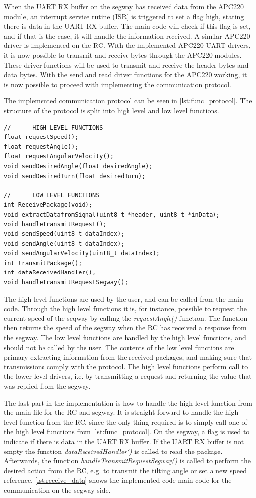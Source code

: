 When the UART RX buffer on the segway has received data from the APC220 module, an interrupt service rutine (ISR) is triggered to set a flag high, stating there is data in the UART RX buffer. The main code will check if this flag is set, and if that is the case, it will handle the information received. 
A similar APC220 driver is implemented on the RC. With the implemented APC220 UART drivers, it is now possible to transmit and receive bytes through the APC220 modules. These driver functions will be used to transmit and receive the header bytes and data bytes. With the send and read driver functions for the APC220 working, it is now possible to proceed with implementing the communication protocol. 

The implemented communication protocol can be seen in \autoref{lst:func_protocol}. The structure of the protocol is split into high level and low level functions.\newpage
{}
\begin{lstlisting}
//		HIGH LEVEL FUNCTIONS
float requestSpeed();
float requestAngle();
float requestAngularVelocity();
void sendDesiredAngle(float desiredAngle);
void sendDesiredTurn(float desiredTurn);

//		LOW LEVEL FUNCTIONS
int ReceivePackage(void);
void extractDatafromSignal(uint8_t *header, uint8_t *inData);
void handleTransmitRequest();
void sendSpeed(uint8_t dataIndex);
void sendAngle(uint8_t dataIndex);
void sendAngularVelocity(uint8_t dataIndex);
int transmitPackage(); 
int dataReceivedHandler();
void handleTransmitRequestSegway();
\end{lstlisting}
The high level functions are used by the user, and can be called from the main code. Through the high level functions it is, for instance, possible to request the current speed of the seqway by calling the \textit{requestAngle()} function. The function then returns the speed of the segway when the RC has received a response from the segway. The low level functions are handled by the high level functions, and should not be called by the user. The contents of the low level functions are primary extracting information from the received packages, and making sure that transmissions comply with the protocol. The high level functions perform call to the lower level drivers, i.e. by transmitting a request and returning the value that was replied from the segway.

The last part in the implementation is how to handle the high level function from the main file for the RC and segway. It is straight forward to handle the high level function from the RC, since the only thing required is to simply call one of the high level functions from \autoref{lst:func_protocol}. On the segway, a flag is used to indicate if there is data in the UART RX buffer. If the UART RX buffer is not empty the function \textit{dataReceivedHandler()} is called to read the package. Afterwards, the function \textit{handleTransmitRequestSegway()} is called to perform the desired action from the RC, e.g. to transmit the tilting angle or set a new speed reference. \autoref{lst:receive_data} shows the implemented code main code for the communication on the segway side.

